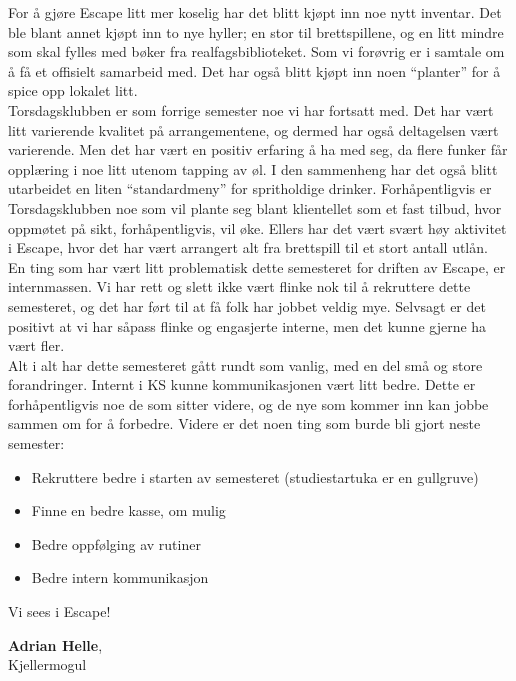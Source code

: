\documentclass[10pt,norsk,a4paper]{article}
\begin{document}
\begin{multicols}{2}
For å gjøre Escape litt mer koselig har det blitt kjøpt inn noe nytt inventar. Det ble blant annet kjøpt inn to nye hyller; en stor til brettspillene, og en litt mindre som skal fylles med bøker fra realfagsbiblioteket. Som vi forøvrig er i samtale om å få et offisielt samarbeid med. Det har også blitt kjøpt inn noen “planter” for å spice opp lokalet litt.\\

Torsdagsklubben er som forrige semester noe vi har fortsatt med. Det har vært litt varierende kvalitet på arrangementene, og dermed har også deltagelsen vært varierende. Men det har vært en positiv erfaring å ha med seg, da flere funker får opplæring i noe litt utenom tapping av øl. I den sammenheng har det også blitt utarbeidet en liten “standardmeny” for spritholdige drinker. Forhåpentligvis er Torsdagsklubben noe som vil plante seg blant klientellet som et fast tilbud, hvor oppmøtet på sikt, forhåpentligvis, vil øke. Ellers har det vært svært høy aktivitet i Escape, hvor det har vært arrangert alt fra brettspill til et stort antall utlån.\\

En ting som har vært litt problematisk dette semesteret for driften av Escape, er internmassen. Vi har rett og slett ikke vært flinke nok til å rekruttere dette semesteret, og det har ført til at få folk har jobbet veldig mye. Selvsagt er det positivt at vi har såpass flinke og engasjerte interne, men det kunne gjerne ha vært fler.\\

Alt i alt har dette semesteret gått rundt som vanlig, med en del små og store forandringer. Internt i KS kunne kommunikasjonen vært litt bedre. Dette er forhåpentligvis noe de som sitter videre, og de nye som kommer inn kan jobbe sammen om for å forbedre. Videre er det noen ting som burde bli gjort neste semester:\\
\begin{itemize}
		\item Rekruttere bedre i starten av semesteret (studiestartuka er en gullgruve)
		\item Finne en bedre kasse, om mulig
		\item Bedre oppfølging av rutiner
		\item Bedre intern kommunikasjon
\end{itemize}
\end{multicols}
Vi sees i Escape!

\textbf{Adrian Helle}, \\
Kjellermogul \\
\date{24.\ april 2018}
\end{document}

